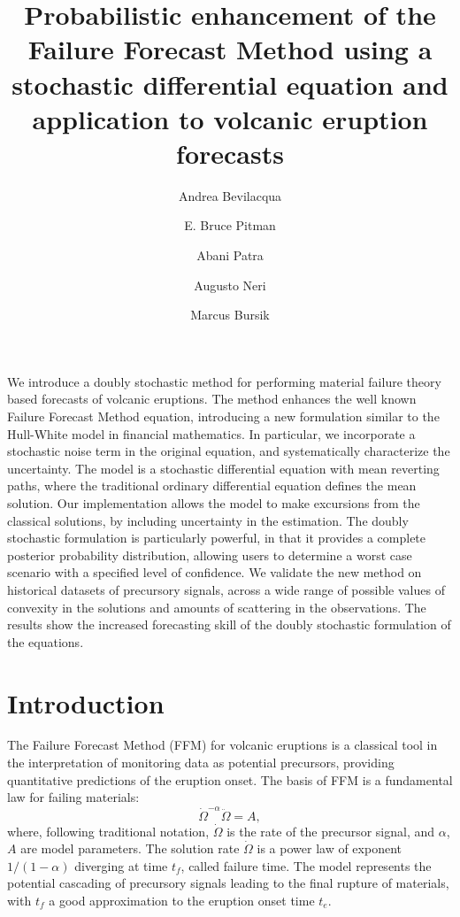 \documentclass{article}
\begin{document}
\title{Probabilistic enhancement of the Failure Forecast Method using a stochastic differential equation and application to volcanic eruption forecasts}
\author[1,5]{Andrea Bevilacqua}
\author[2]{E. Bruce Pitman}
\author[3,4]{Abani Patra}
\author[5]{Augusto Neri}
\author[1]{Marcus Bursik}



\maketitle
\abstract
We introduce a doubly stochastic method for performing material failure theory based forecasts of volcanic eruptions. The method enhances the well known Failure Forecast Method equation, introducing a new formulation similar to the Hull-White model in financial mathematics. In particular, we incorporate a stochastic noise term in the original equation, and systematically characterize the uncertainty. The model is a stochastic differential equation with mean reverting paths, where the traditional ordinary differential equation defines the mean solution. Our implementation allows the model to make excursions from the classical solutions, by including uncertainty in the estimation. The doubly stochastic formulation is particularly powerful, in that it provides a complete posterior probability distribution, allowing users to determine a worst case scenario with a specified level of confidence. We validate the new method on historical datasets of precursory signals, across a wide range of possible values of convexity in the solutions and amounts of scattering in the observations. The results show the increased forecasting skill of the doubly stochastic formulation of the equations.

\section{Introduction}
The Failure Forecast Method (FFM) for volcanic eruptions is a classical tool in the interpretation of monitoring data as potential precursors, providing quantitative predictions of the eruption onset. The basis of FFM is a fundamental law for failing materials:
$$\dot\Omega^{-\alpha}\ddot{\Omega}=A,$$
where, following traditional notation, $\dot\Omega$ is the rate of the precursor signal, and $\alpha$, $A$ are model parameters. The solution rate $\dot\Omega$ is a power law of exponent $1/(1-\alpha)$ diverging at time $t_f$, called failure time. The model represents the potential cascading of precursory signals leading to the final rupture of materials, with $t_f$ a good approximation to the eruption onset time $t_e$.
\end{document}
